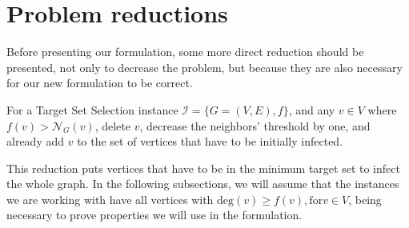 \section{Problem reductions}
Before presenting our formulation, some more direct reduction should be presented, not only to decrease the problem, but because they are also necessary for our new formulation to be correct.

\begin{myred}
    For a Target Set Selection instance $\mathcal{I} = \{G = (V,E), f\}$, and any $v \in V$ where $f(v) > \mathcal{N}_{G}(v)$, delete $v$, decrease the neighbors' threshold by one, and already add $v$ to the set of vertices that have to be initially infected.
\end{myred}

This reduction puts vertices that have to be in the minimum target set to infect the whole graph. In the following subsections, we will assume that the instances we are working with have all vertices with $\text{deg}(v) \geq f(v), \text{for} v \in V$, being necessary to prove properties we will use in the formulation.

